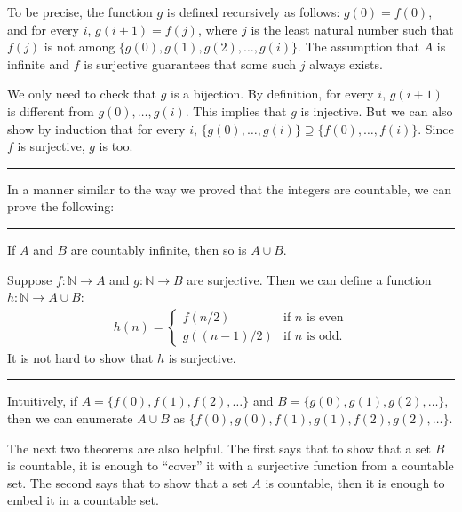 \documentclass[letterpaper,10pt,english]{sphinxmanual}
\begin{document}
\sphinxAtStartPar
To be precise, the function \(g\) is defined recursively as follows: \(g(0) = f(0)\), and for every \(i\), \(g(i+1) = f(j)\), where \(j\) is the least natural number such that \(f(j)\) is not among \(\{g(0), g(1), g(2), \ldots, g(i) \}\). The assumption that \(A\) is infinite and \(f\) is surjective guarantees that some such \(j\) always exists.

\sphinxAtStartPar
We only need to check that \(g\) is a bijection. By definition, for every \(i\), \(g(i+1)\) is different from \(g(0), \ldots, g(i)\). This implies that \(g\) is injective. But we can also show by induction that for every \(i\), \(\{g(0), \ldots, g(i)\} \supseteq \{ f(0), \ldots, f(i)\}\). Since \(f\) is surjective, \(g\) is too.


\bigskip\hrule\bigskip


\sphinxAtStartPar
In a manner similar to the way we proved that the integers are countable, we can prove the following:


\bigskip\hrule\bigskip


\sphinxAtStartPar
{} If \(A\) and \(B\) are countably infinite, then so is \(A \cup B\).

\sphinxAtStartPar
{} Suppose \(f : \mathbb{N} \to A\) and \(g : \mathbb{N} \to B\) are surjective. Then we can define a function \(h : \mathbb{N} \to A \cup B\):
\begin{equation*}
\begin{split}h(n) = \begin{cases}
         f(n/2) & \mbox{if $n$ is even} \\
         g((n-1)/2) & \mbox{if $n$ is odd.}
       \end{cases}\end{split}
\end{equation*}
\sphinxAtStartPar
It is not hard to show that \(h\) is surjective.


\bigskip\hrule\bigskip


\sphinxAtStartPar
Intuitively, if \(A = \{ f(0), f(1), f(2), \ldots \}\) and \(B = \{ g(0), g(1), g(2), \ldots\}\), then we can enumerate \(A \cup B\) as \(\{ f(0), g(0), f(1), g(1), f(2), g(2), \ldots \}\).

\sphinxAtStartPar
The next two theorems are also helpful. The first says that to show that a set \(B\) is countable, it is enough to “cover” it with a surjective function from a countable set. The second says that to show that a set \(A\) is countable, then it is enough to embed it in a countable set.
\end{document}
